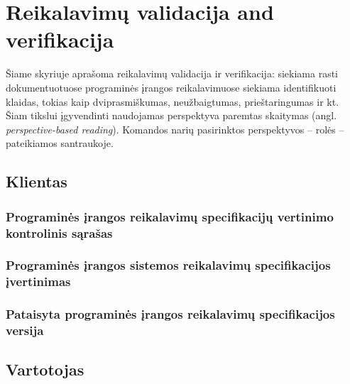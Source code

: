 \documentclass{VUMIFPSkursinis}
\begin{document}
\section{Reikalavimų validacija and verifikacija}

Šiame skyriuje aprašoma reikalavimų validacija ir verifikacija: siekiama rasti dokumentuotuose programinės įrangos
reikalavimuose siekiama identifikuoti klaidas, tokias kaip dviprasmiškumas, neužbaigtumas, prieštaringumas ir kt.
Šiam tikslui įgyvendinti naudojamas perspektyva paremtas skaitymas (angl. \textit{perspective-based reading}). Komandos narių
pasirinktos perspektyvos -- rolės -- pateikiamos santraukoje.

\subsection{Klientas}

\subsubsection{Programinės įrangos reikalavimų specifikacijų vertinimo kontrolinis sąrašas}

\subsubsection{Programinės įrangos sistemos reikalavimų specifikacijos įvertinimas}

\subsubsection{Pataisyta programinės įrangos reikalavimų specifikacijos versija}

		\subsection{Vartotojas}
\end{document}
